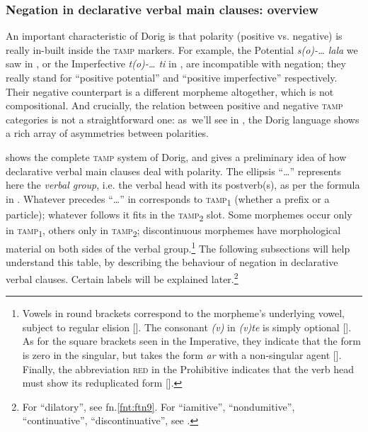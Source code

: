 \documentclass[output=paper,colorlinks,citecolor=brown,draft]{langscibook}
\begin{document}
\subsubsection{Negation in declarative verbal main clauses: overview}\label{sec:dor:2.1.1}
\label{bkm:Ref36399531}\label{bkm:Ref66638886}
An important characteristic of Dorig is that polarity (positive vs. negative) is really in-built inside the \textsc{tamp} markers. For example, the Potential \textit{s(o)-… lala} we saw in , or the Imperfective \textit{t(o)-… ti} in , are incompatible with negation; they really stand for “positive potential” and “positive imperfective” respectively. Their negative counterpart is a different morpheme altogether, which is not compositional. And crucially, the relation between positive and negative \textsc{tamp} categories is not a straightforward one: as~we’ll see in , the Dorig language shows a rich array of asymmetries between polarities.

 shows the complete \textsc{tamp} system of Dorig, and gives a preliminary idea of how declarative verbal main clauses deal with polarity. The ellipsis “…” represents here the \textit{verbal group}, i.e. the verbal head with its postverb(s), as per the formula in . Whatever precedes “…” in  corresponds to \textsc{tamp}\textsubscript{1} (whether a prefix or a particle); whatever follows it fits in the \textsc{tamp}\textsubscript{2} slot. Some morphemes occur only in \textsc{tamp}\textsubscript{1}, others only in \textsc{tamp}\textsubscript{2}; discontinuous morphemes have morphological material on both sides of the verbal group.\footnote{Vowels in round brackets correspond to the morpheme’s underlying vowel, subject to regular elision []. The consonant \textit{(v)} in \textit{(v)te} is simply optional []. As for the square brackets seen in the Imperative, they indicate that the form is zero in the singular, but takes the form \textit{ar} with a non-singular agent []. Finally, the abbreviation \textsc{red} in the Prohibitive indicates that the verb head must show its reduplicated form [].}
The following subsections will help understand this table, by describing the behaviour of negation in declarative verbal clauses. Certain labels will be explained later.\footnote{\label{bkm:Ref130472068} For “dilatory”, see fn.\ref{fnt:ftn9}. For “iamitive”, “nondumitive”, “continuative”, “discontinuative”, see .}
\end{document}
